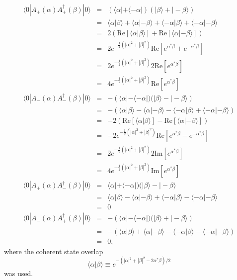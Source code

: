 \documentclass[aps,prl,twocolumn,amsmath,amssymb,nofootinbib,superscriptaddress]{revtex4}
\newcommand{\bra}[1]{\langle#1|}
\newcommand{\ket}[1]{|#1\rangle}
\newcommand{\ip}[2]{\langle{#1}|{#2}\rangle}
\begin{document}
\begin{eqnarray}
\bra{0}A_+(\alpha)A^\dag_+(\beta)\ket{0}&=& (\bra{\alpha}+\bra{-\alpha})(\ket{\beta}+\ket{-\beta}) \nonumber \\
&=& \ip{\alpha}{\beta}+\ip{\alpha}{-\beta}+\ip{-\alpha}{\beta}+\ip{-\alpha}{-\beta} \nonumber \\
&=& 2\left(\mathrm{Re}\left[\ip{\alpha}{\beta}\right]+\mathrm{Re}\left[\ip{\alpha}{-\beta}\right]\right) \nonumber \\
&=& 2 e^{-\frac{1}{2}(|\alpha|^2+|\beta|^2)}\mathrm{Re}\left[e^{\alpha^*\beta}+e^{-\alpha^*\beta} \right] \nonumber \\
&=& 2 e^{-\frac{1}{2}(|\alpha|^2+|\beta|^2)} 2\mathrm{Re}\left[e^{\alpha^*\beta}\right] \nonumber \\
&=& 4 e^{-\frac{1}{2}(|\alpha|^2+|\beta|^2)} \mathrm{Re}\left[e^{\alpha^*\beta}\right] \\
\bra{0}A_-(\alpha)A^\dag_-(\beta)\ket{0}&=& -\left(\bra{\alpha}-\bra{-\alpha})(\ket{\beta}-\ket{-\beta}\right) \nonumber \\
&=& -\left(\ip{\alpha}{\beta}-\ip{\alpha}{-\beta}-\ip{-\alpha}{\beta}+\ip{-\alpha}{-\beta}\right) \nonumber \\
&=& -2\left(\mathrm{Re}\left[\ip{\alpha}{\beta}\right]-\mathrm{Re}\left[\ip{\alpha}{-\beta}\right]\right) \nonumber \\
&=& -2 e^{-\frac{1}{2}(|\alpha|^2+|\beta|^2)}\mathrm{Re}\left[e^{\alpha^*\beta}-e^{-\alpha^*\beta} \right] \nonumber \\
&=& 2 e^{-\frac{1}{2}(|\alpha|^2+|\beta|^2)} 2\mathrm{Im}\left[e^{\alpha^*\beta}\right] \nonumber \\
&=& 4 e^{-\frac{1}{2}(|\alpha|^2+|\beta|^2)} \mathrm{Im}\left[e^{\alpha^*\beta}\right] \\
\bra{0}A_+(\alpha)A^\dag_-(\beta)\ket{0}&=& \bra{\alpha}+\bra{-\alpha})(\ket{\beta}-\ket{-\beta} \nonumber \\
&=& \ip{\alpha}{\beta}-\ip{\alpha}{-\beta}+\ip{-\alpha}{\beta}-\ip{-\alpha}{-\beta} \nonumber \\
&=& 0 \\
\bra{0}A_-(\alpha)A^\dag_+(\beta)\ket{0}&=& -\left(\bra{\alpha}-\bra{-\alpha})(\ket{\beta}+\ket{-\beta}\right) \nonumber \\
&=& -\left(\ip{\alpha}{\beta}+\ip{\alpha}{-\beta}-\ip{-\alpha}{\beta}-\ip{-\alpha}{-\beta}\right) \nonumber \\
&=& 0,
\end{eqnarray}
where the coherent state overlap
\begin{equation}
\ip{\alpha}{\beta}\equiv e^{-(|\alpha|^2+|\beta|^2 - 2\alpha^*\beta)/2}
\end{equation}
was used.
\end{document}
